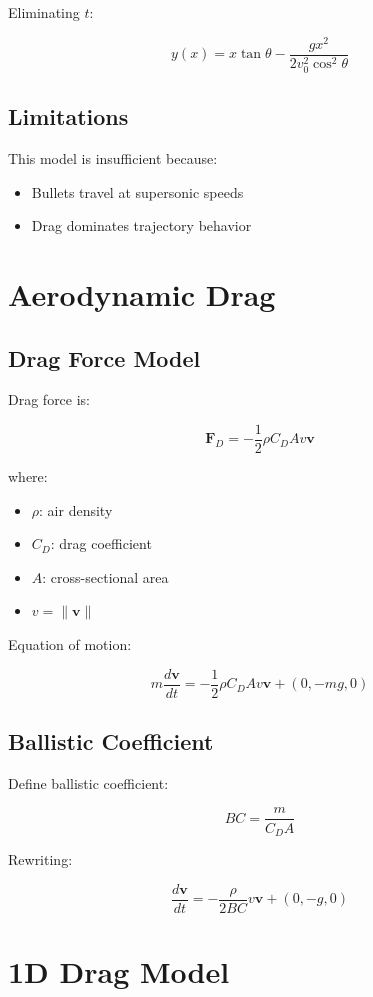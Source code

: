 \documentclass[11pt]{article}
\begin{document}
	Eliminating $t$:
	
	\[
	y(x) = x \tan\theta - \frac{g x^2}{2 v_0^2 \cos^2\theta}
	\]
	
	\subsection{Limitations}
	
	This model is insufficient because:
	\begin{itemize}
		\item Bullets travel at supersonic speeds
		\item Drag dominates trajectory behavior
	\end{itemize}
	
	\section{Aerodynamic Drag}
	
	\subsection{Drag Force Model}
	
	Drag force is:
	
	\[
	\bm{F}_D = -\frac{1}{2} \rho C_D A v \bm{v}
	\]
	
	where:
	\begin{itemize}
		\item $\rho$: air density
		\item $C_D$: drag coefficient
		\item $A$: cross-sectional area
		\item $v = \|\bm{v}\|$
	\end{itemize}
	
	Equation of motion:
	
	\[
	m \frac{d\bm{v}}{dt} = -\frac{1}{2} \rho C_D A v \bm{v} + (0, -mg, 0)
	\]
	
	\subsection{Ballistic Coefficient}
	
	Define ballistic coefficient:
	
	\[
	BC = \frac{m}{C_D A}
	\]
	
	Rewriting:
	
	\[
	\frac{d\bm{v}}{dt} = -\frac{\rho}{2 BC} v \bm{v} + (0, -g, 0)
	\]
	
	\section{1D Drag Model}
	
\end{document}
